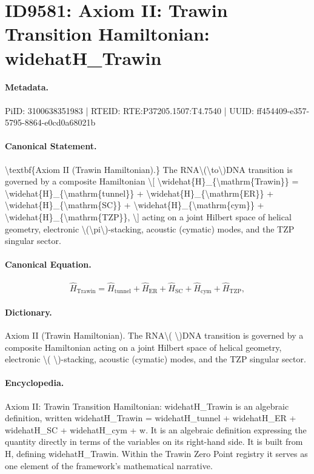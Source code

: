 \section*{ID9581: Axiom II: Trawin Transition Hamiltonian: widehatH\_Trawin}
\paragraph{Metadata.}
PiID: 3100638351983 | RTEID: RTE:P37205.1507:T4.7540 | UUID: ff454409-e357-5795-8864-e0cd0a68021b

\paragraph{Canonical Statement.}
\textbackslash{}textbf\{Axiom II (Trawin Hamiltonian).\} The RNA\textbackslash{}(\textbackslash{}to\textbackslash{})DNA transition is governed by a composite Hamiltonian \textbackslash{}[ \textbackslash{}widehat\{H\}\_\{\textbackslash{}mathrm\{Trawin\}\} = \textbackslash{}widehat\{H\}\_\{\textbackslash{}mathrm\{tunnel\}\} + \textbackslash{}widehat\{H\}\_\{\textbackslash{}mathrm\{ER\}\} + \textbackslash{}widehat\{H\}\_\{\textbackslash{}mathrm\{SC\}\} + \textbackslash{}widehat\{H\}\_\{\textbackslash{}mathrm\{cym\}\} + \textbackslash{}widehat\{H\}\_\{\textbackslash{}mathrm\{TZP\}\}, \textbackslash{}] acting on a joint Hilbert space of helical geometry, electronic \textbackslash{}(\textbackslash{}pi\textbackslash{})-stacking, acoustic (cymatic) modes, and the TZP singular sector.

\paragraph{Canonical Equation.}
\[
\widehat{H}_{\mathrm{Trawin}} = \widehat{H}_{\mathrm{tunnel}} + \widehat{H}_{\mathrm{ER}} + \widehat{H}_{\mathrm{SC}} + \widehat{H}_{\mathrm{cym}} + \widehat{H}_{\mathrm{TZP}},
\]

\paragraph{Dictionary.}
Axiom II (Trawin Hamiltonian). The RNA\textbackslash{}( \textbackslash{})DNA transition is governed by a composite Hamiltonian acting on a joint Hilbert space of helical geometry, electronic \textbackslash{}( \textbackslash{})-stacking, acoustic (cymatic) modes, and the TZP singular sector.

\paragraph{Encyclopedia.}
Axiom II: Trawin Transition Hamiltonian: widehatH\_Trawin is an algebraic definition, written widehatH\_Trawin = widehatH\_tunnel + widehatH\_ER + widehatH\_SC + widehatH\_cym + w. It is an algebraic definition expressing the quantity directly in terms of the variables on its right-hand side. It is built from H, defining widehatH\_Trawin. Within the Trawin Zero Point registry it serves as one element of the framework's mathematical narrative.
